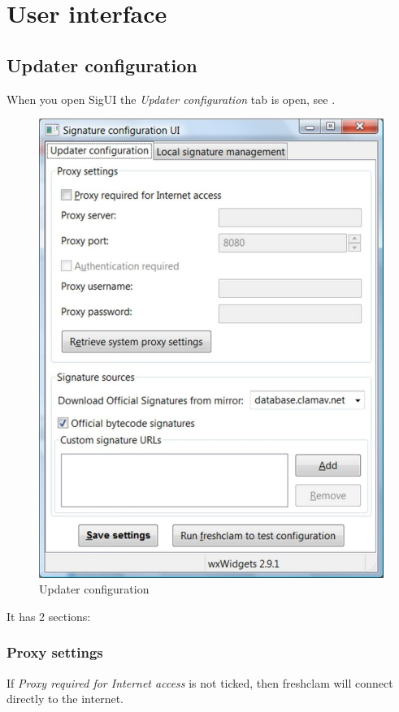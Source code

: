 \chapter{User interface}
\section{Updater configuration}
When you open SigUI the \emph{Updater configuration} tab is open, see .
\begin{figure}[htb]
\centering
\includegraphics{sigui_tab1.jpg}
\caption{Updater configuration}
\label{fig:tab1}
\end{figure}

It has 2 sections:
\subsection{Proxy settings}
If \emph{Proxy required for Internet access} is not ticked, then \gls{freshclam} will connect directly to the internet.

